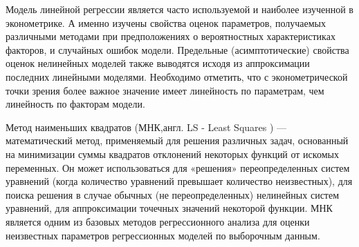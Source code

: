 \documentclass[a4paper, 12pt]{article}
\begin{document}
	Модель линейной регрессии является часто используемой и наиболее изученной в эконометрике. А именно изучены свойства оценок параметров, получаемых различными методами при предположениях о вероятностных характеристиках факторов, и случайных ошибок модели. Предельные (асимптотические) свойства оценок нелинейных моделей также выводятся исходя из аппроксимации последних линейными моделями. Необходимо отметить, что с эконометрической точки зрения более важное значение имеет линейность по параметрам, чем линейность по факторам модели.
	
	Метод наименьших квадратов (МНК,англ. LS - Least Squares ) — математический метод, применяемый для решения различных задач, основанный на минимизации суммы квадратов отклонений некоторых функций от искомых переменных. Он может использоваться для «решения» переопределенных систем уравнений (когда количество уравнений превышает количество неизвестных), для поиска решения в случае обычных (не переопределенных) нелинейных систем уравнений, для аппроксимации точечных значений некоторой функции. МНК является одним из базовых методов регрессионного анализа для оценки неизвестных параметров регрессионных моделей по выборочным данным.
	
\end{document}
